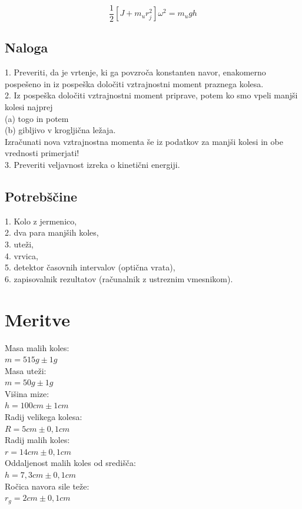 \documentclass[a4paper]{report}
\begin{document}
\[\frac{1}{2}[J+m_ur_j^2]\omega^2=m_u gh\]


\section*{Naloga}

1. Preveriti, da je vrtenje, ki ga povzroča konstanten navor, enakomerno pospešeno
in iz pospeška določiti vztrajnostni moment praznega kolesa.\\
2. Iz pospeška določiti vztrajnostni moment priprave, potem ko smo vpeli manjši
kolesi najprej\\
(a) togo in potem\\
(b) gibljivo v krogljična ležaja.\\
Izračunati nova vztrajnostna momenta še iz podatkov za manjši kolesi in obe vrednosti primerjati!\\
3. Preveriti veljavnost izreka o kinetični energiji.

\section*{Potrebščine}

1. Kolo z jermenico,\\
2. dva para manjših koles,\\
3. uteži,\\
4. vrvica,\\
5. detektor časovnih intervalov (optična vrata),\\
6. zapisovalnik rezultatov (računalnik z ustreznim vmesnikom).
\chapter*{Meritve}
Masa malih koles:\\
$m= 515g \pm 1g$\\
\noindent Masa uteži:\\
$m=50g \pm 1g$\\
\noindent Višina mize:\\
$h=100cm \pm 1cm$\\
\noindent Radij velikega kolesa:\\
$R=5cm \pm 0,1cm$\\
\noindent Radij malih koles:\\
$r=14cm \pm 0,1cm$\\
\noindent Oddaljenost malih koles od središča:\\
$h=7,3cm \pm 0,1cm$\\
\noindent Ročica navora sile teže:\\
$r_g = 2cm \pm 0,1cm$\\
\end{document}
